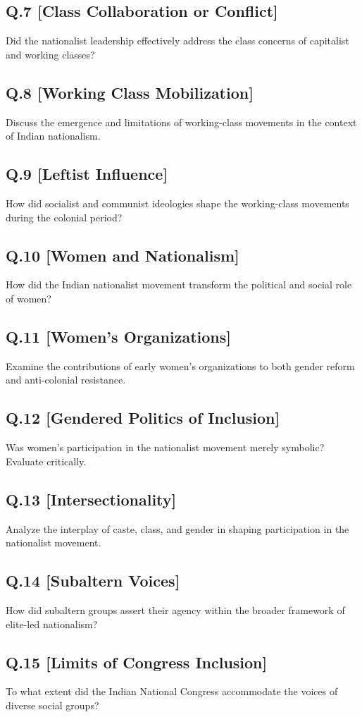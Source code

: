 \subsection*{Q.7 [Class Collaboration or Conflict]}
Did the nationalist leadership effectively address the class concerns of capitalist and working classes?

\subsection*{Q.8 [Working Class Mobilization]}
Discuss the emergence and limitations of working-class movements in the context of Indian nationalism.

\subsection*{Q.9 [Leftist Influence]}
How did socialist and communist ideologies shape the working-class movements during the colonial period?

\subsection*{Q.10 [Women and Nationalism]}
How did the Indian nationalist movement transform the political and social role of women?

\subsection*{Q.11 [Women’s Organizations]}
Examine the contributions of early women’s organizations to both gender reform and anti-colonial resistance.

\subsection*{Q.12 [Gendered Politics of Inclusion]}
Was women’s participation in the nationalist movement merely symbolic? Evaluate critically.

\subsection*{Q.13 [Intersectionality]}
Analyze the interplay of caste, class, and gender in shaping participation in the nationalist movement.

\subsection*{Q.14 [Subaltern Voices]}
How did subaltern groups assert their agency within the broader framework of elite-led nationalism?

\subsection*{Q.15 [Limits of Congress Inclusion]}
To what extent did the Indian National Congress accommodate the voices of diverse social groups?
